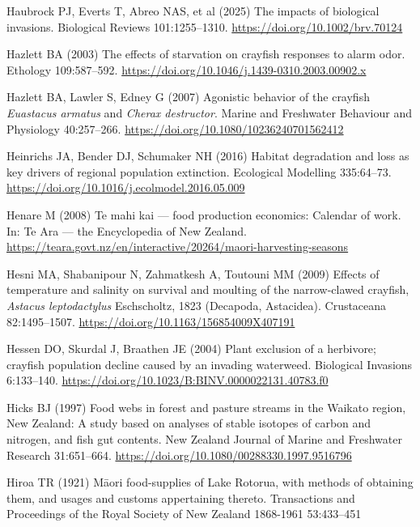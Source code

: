 \documentclass[
  12pt,
  a4paper,
  oneside]{scrbook}
\newlength{\cslhangindent}
\newenvironment{CSLReferences}[2] %
 {\begin{list}{}{%
  \setlength{\itemindent}{0pt}
  \setlength{\leftmargin}{0pt}
  \setlength{\parsep}{0pt}
  \ifodd #1
   \setlength{\leftmargin}{\cslhangindent}
   \setlength{\itemindent}{-1\cslhangindent}
  \fi
  \setlength{\itemsep}{#2\baselineskip}}}
 {\end{list}}
\renewenvironment{CSLReferences}[2]
   {\begin{list}{}{%
    \setlength{\itemindent}{0pt}
    \setlength{\leftmargin}{0pt}
    \setlength{\parsep}{0pt}
    \ifodd #1
     \setlength{\leftmargin}{\cslhangindent}
     \setlength{\itemindent}{-1\cslhangindent}
    \fi
    \setlength{\itemsep}{0.3\baselineskip}}}
   {\end{list}}%
\begin{document}
\begin{CSLReferences}{1}{1}
Haubrock PJ, Everts T, Abreo NAS, et al (2025) The impacts of biological
invasions. Biological Reviews 101:1255--1310.
\url{https://doi.org/10.1002/brv.70124}

Hazlett BA (2003) The effects of starvation on crayfish responses to
alarm odor. Ethology 109:587--592.
\url{https://doi.org/10.1046/j.1439-0310.2003.00902.x}

Hazlett BA, Lawler S, Edney G (2007) Agonistic behavior of the crayfish
{\emph{Euastacus armatus}} and {\emph{Cherax destructor}}. Marine and
Freshwater Behaviour and Physiology 40:257--266.
\url{https://doi.org/10.1080/10236240701562412}

Heinrichs JA, Bender DJ, Schumaker NH (2016) Habitat degradation and
loss as key drivers of regional population extinction. Ecological
Modelling 335:64--73.
\url{https://doi.org/10.1016/j.ecolmodel.2016.05.009}

Henare M (2008) Te mahi kai --- food production economics: Calendar of
work. In: Te Ara --- the Encyclopedia of {New Zealand}.
\url{https://teara.govt.nz/en/interactive/20264/maori-harvesting-seasons}

Hesni MA, Shabanipour N, Zahmatkesh A, Toutouni MM (2009) Effects of
temperature and salinity on survival and moulting of the narrow-clawed
crayfish, {\emph{Astacus leptodactylus}} {Eschscholtz}, 1823
({Decapoda}, {Astacidea}). Crustaceana 82:1495--1507.
\url{https://doi.org/10.1163/156854009X407191}

Hessen DO, Skurdal J, Braathen JE (2004) Plant exclusion of a herbivore;
crayfish population decline caused by an invading waterweed. Biological
Invasions 6:133--140.
\url{https://doi.org/10.1023/B:BINV.0000022131.40783.f0}

Hicks BJ (1997) Food webs in forest and pasture streams in the {Waikato}
region, {New Zealand}: A study based on analyses of stable isotopes of
carbon and nitrogen, and fish gut contents. New Zealand Journal of
Marine and Freshwater Research 31:651--664.
\url{https://doi.org/10.1080/00288330.1997.9516796}

Hiroa TR (1921) M{ā}ori food-supplies of {Lake Rotorua}, with methods of
obtaining them, and usages and customs appertaining thereto.
Transactions and Proceedings of the Royal Society of New Zealand
1868-1961 53:433--451


\end{CSLReferences}
\end{document}

